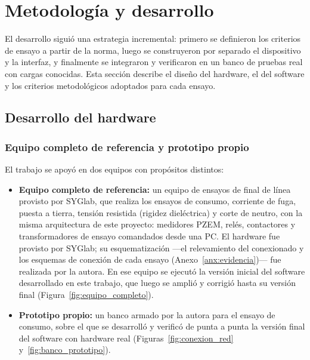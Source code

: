 \section{Metodología y desarrollo}
\label{sec:metodologia}

El desarrollo siguió una estrategia incremental: primero se definieron los
criterios de ensayo a partir de la norma, luego se construyeron por separado el
dispositivo y la interfaz, y finalmente se integraron y verificaron en un banco de
pruebas real con cargas conocidas. Esta sección describe el diseño del hardware,
el del software y los criterios metodológicos adoptados para cada ensayo.

\subsection{Desarrollo del hardware}
\label{subsec:metodologia_hw}

\subsubsection{Equipo completo de referencia y prototipo propio}
\label{subsubsec:equipo_syglab}

El trabajo se apoyó en dos equipos con propósitos distintos:
\begin{itemize}
    \item \textbf{Equipo completo de referencia:} un equipo de ensayos de final de
          línea provisto por SYGlab, que realiza los ensayos de consumo,
          corriente de fuga, puesta a tierra, tensión resistida (rigidez
          dieléctrica) y corte de neutro, con la misma
          arquitectura de este proyecto: medidores PZEM, relés, contactores y
          transformadores de ensayo comandados desde una PC. El hardware fue
          provisto por SYGlab; su esquematización ---el relevamiento del
          conexionado y los esquemas de conexión de cada ensayo
          (Anexo~\ref{anx:evidencia})--- fue realizada por la autora. En ese equipo
          se ejecutó la versión inicial del software desarrollado en este
          trabajo, que luego se amplió y corrigió hasta su versión final
          (Figura~\ref{fig:equipo_completo}).
    \item \textbf{Prototipo propio:} un banco armado por la autora para el ensayo
          de consumo, sobre el que se desarrolló y verificó de punta a punta la
          versión final del software con hardware real
          (Figuras~\ref{fig:conexion_red} y~\ref{fig:banco_prototipo}).
\end{itemize}

